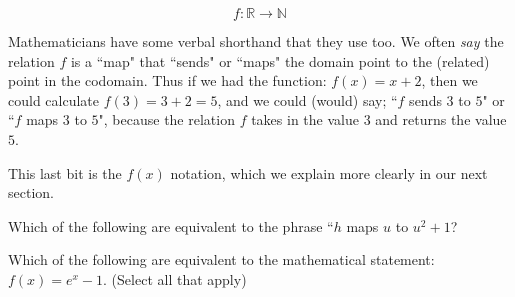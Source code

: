 \documentclass{ximera}
\begin{document}
\[
    f: \mathbb{R} \rightarrow \mathbb{N}
\]

Mathematicians have some verbal shorthand that they use too. We often \textit{say} the relation $f$ is a ``map" that ``sends" or ``maps" the domain point to the (related) point in the codomain. Thus if we had the function: $f(x) = x + 2$, then we could calculate $f(3) = 3 + 2 = 5$, and we could (would) say; ``$f$ sends $3$ to $5$" or ``$f$ maps $3$ to $5$", because the relation $f$ takes in the value $3$ and returns the value $5$.

This last bit is the $f(x)$ notation, which we explain more clearly in our next section.



\begin{problem}
    Which of the following are equivalent to the phrase ``$h$ maps $u$ to $u^2 + 1$?
    \begin{selectAll}
    \end{selectAll}
\end{problem}

\begin{problem}
    Which of the following are equivalent to the mathematical statement: $f(x) = e^x - 1$. (Select all that apply)
    \begin{selectAll}
    \end{selectAll}
\end{problem}
\end{document}
